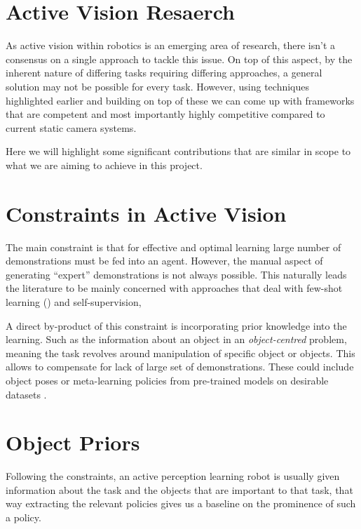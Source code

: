 \section{Active Vision Resaerch}

As active vision within robotics is an emerging area of research, there isn't a consensus on a single approach to tackle this issue. On top of this aspect, by the inherent nature of differing tasks requiring differing approaches, a general solution may not be possible for every task. However, using techniques highlighted earlier and building on top of these we can come up with frameworks that are competent and most importantly highly competitive compared to current static camera systems.

Here we will highlight some significant contributions that are similar in scope to what we are aiming to achieve in this project.

\section{Constraints in Active Vision}
The main constraint is that for effective and optimal learning large number of demonstrations must be fed into an agent. However, the manual aspect of generating ``expert'' demonstrations is not always possible. This naturally leads the literature to be mainly concerned with approaches that deal with few-shot learning () and self-supervision,

A direct by-product of this constraint is incorporating prior knowledge into the learning. Such as the information about an object in an \emph{object-centred} problem, meaning the task revolves around manipulation of specific object or objects. This allows to compensate for lack of large set of demonstrations. These could include object poses \cite{huang2018generalisedTPlearning, hu2023modelpredictiveoptimisation} or meta-learning policies from pre-trained models on desirable datasets \cite{finn2017oneshotvisualimitationlearning, mandi2022}.


\section{Object Priors}
Following the constraints, an active perception learning robot is usually given information about the task and the objects that are important to that task, that way extracting the relevant policies gives us a baseline on the prominence of such a policy.

